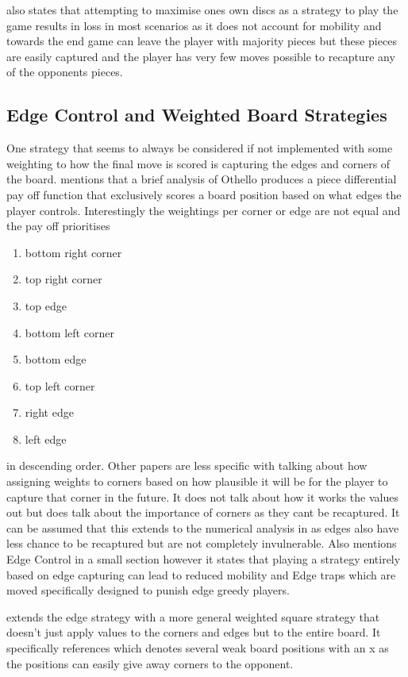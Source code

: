 \documentclass[review]{cmpreport}
\begin{document}
\citet{rosenbloom1982world} also states that attempting to maximise ones own discs as a strategy to play the game results in loss in most scenarios as it does not account for mobility and towards the end game can leave the player with majority pieces but these pieces are easily captured and the player has very few moves possible to recapture any of the opponents pieces.

\subsection{Edge Control and Weighted Board Strategies}\label{edge}
One strategy that seems to always be considered if not implemented with some weighting to how the final move is scored is capturing the edges and corners of the board. \citet{clune2007heuristic} mentions that a brief analysis of Othello produces a piece differential pay off function that exclusively scores a board position based on what edges the player controls. Interestingly the weightings per corner or edge are not equal and the pay off prioritises
\begin{enumerate}
	\item bottom right corner
	\item top right corner
	\item top edge
	\item bottom left corner
	\item bottom edge
	\item top left corner
	\item right edge
	\item left edge
\end{enumerate}
in descending order. Other papers are less specific with \citet[sec 5.1.3 ]{sannidhanam2015analysis} talking about how assigning weights to corners  based on how plausible it will be for the player to capture that corner in the future. It does not talk about how it works the values out but does talk about the importance of corners as they cant be recaptured. It can be assumed that this extends to the numerical analysis in \cite[see Othello]{clune2007heuristic} as edges also have less chance to be recaptured but are not completely invulnerable. \cite{lee1986bill} Also mentions Edge Control in a small section however it states that playing a strategy entirely based on edge capturing can lead to reduced mobility and Edge traps which are moved specifically designed to punish edge greedy players.

\cite{rosenbloom1982world} extends the edge strategy with a more general weighted square strategy that doesn't just apply values to the corners and edges but to the entire board. It specifically references \citet[fig. 2.1]{rosenbloom1982world} which denotes several weak board positions with an x as the positions can easily give away corners to the opponent. 
\end{document}
